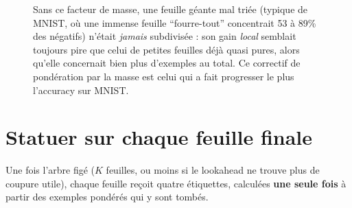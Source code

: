 \documentclass[12pt,a4paper]{article}
\theoremstyle{remark}
\begin{document}
\begin{figure}[h]
\centering
{}
\caption{Sans ce facteur de masse, une feuille géante mal triée (typique de
MNIST, où une immense feuille ``fourre-tout'' concentrait 53 à 89\% des
négatifs) n'était \emph{jamais} subdivisée : son gain \emph{local} semblait
toujours pire que celui de petites feuilles déjà quasi pures, alors qu'elle
concernait bien plus d'exemples au total. Ce correctif de pondération par la
masse est celui qui a fait progresser le plus l'accuracy sur MNIST.}
\label{fig:leafmass}
\end{figure}

\section{Statuer sur chaque feuille finale}\label{sec:leaves}

Une fois l'arbre figé ($K$ feuilles, ou moins si le lookahead ne trouve plus de
coupure utile), chaque feuille reçoit quatre étiquettes, calculées \textbf{une
seule fois} à partir des exemples pondérés qui y sont tombés.
\end{document}
